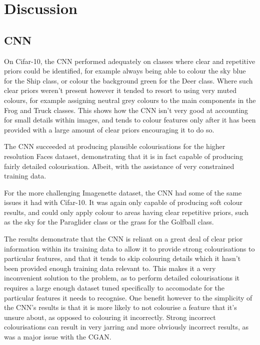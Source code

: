 \documentclass{l4proj}
\begin{document}
\section{Discussion}

\subsection{CNN}

On Cifar-10, the CNN performed adequately on classes where clear and repetitive priors could be identified, for example always being able to colour the sky blue for the Ship class, or colour the background green for the Deer class. Where such clear priors weren't present however it tended to resort to using very muted colours, for example assigning neutral grey colours to the main components in the Frog and Truck classes. This shows how the CNN isn't very good at accounting for small details within images, and tends to colour features only after it has been provided with a large amount of clear priors encouraging it to do so. 

The CNN succeeded at producing plausible colourisations for the higher resolution Faces dataset, demonstrating that it is in fact capable of producing fairly detailed colourisation. Albeit, with the assistance of very constrained training data. 

For the more challenging Imagenette dataset, the CNN had some of the same issues it had with Cifar-10. It was again only capable of producing soft colour results, and could only apply colour to areas having clear repetitive priors, such as the sky for the Paraglider class or the grass for the Golfball class. 

The results demonstrate that the CNN is reliant on a great deal of clear prior information within its training data to allow it to provide strong colourisations to particular features, and that it tends to skip colouring details which it hasn't been provided enough training data relevant to. This makes it a very inconvenient solution to the problem, as to perform detailed colourisations it requires a large enough dataset tuned specifically to accomodate for the particular features it needs to recognise. One benefit however to the simplicity of the CNN's results is that it is more likely to not colourise a feature that it's unsure about, as opposed to colouring it incorrectly. Strong incorrect colourisations can result in very jarring and more obviously incorrect results, as was a major issue with the CGAN.
\end{document}
